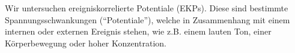 \documentclass[10pt]{article}
\begin{document}
Wir untersuchen ereigniskorrelierte Potentiale (EKPs). 
Diese sind bestimmte Spannungsschwankungen (\enquote{Potentiale}), welche in Zusammenhang mit einem internen oder externen Ereignis stehen, wie z.B. einem lauten Ton, einer Körperbewegung oder hoher Konzentration.  %







\end{document}
